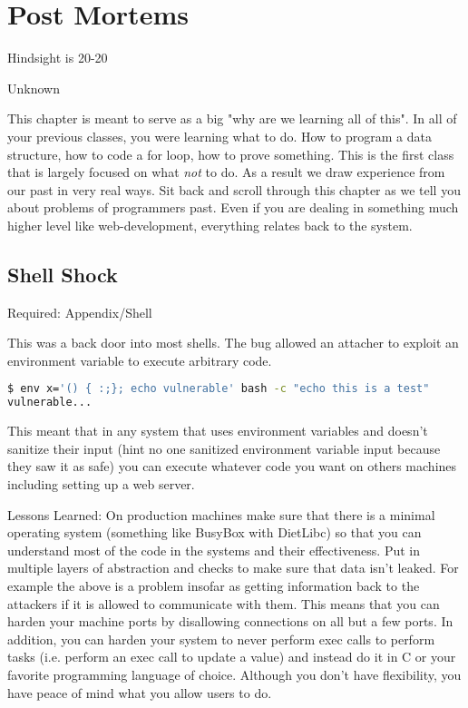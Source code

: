 \chapter{Post Mortems}

\epigraph{Hindsight is 20-20}{Unknown}

This chapter is meant to serve as a big "why are we learning all of this". In all of your previous classes, you were learning what to do. How to program a data structure, how to code a for loop, how to prove something. This is the first class that is largely focused on what \textit{not} to do. As a result we draw experience from our past in very real ways. Sit back and scroll through this chapter as we tell you about problems of programmers past. Even if you are dealing in something much higher level like web-development, everything relates back to the system.

\section{Shell Shock}

Required: Appendix/Shell

This was a back door into most shells. The bug allowed an attacher to exploit an environment variable to execute arbitrary code.

\begin{lstlisting}[language=bash]
$ env x='() { :;}; echo vulnerable' bash -c "echo this is a test"
vulnerable...
\end{lstlisting}

This meant that in any system that uses environment variables and doesn't sanitize their input (hint no one sanitized environment variable input because they saw it as safe) you can execute whatever code you want on others machines including setting up a web server.

Lessons Learned: On production machines make sure that there is a minimal operating system (something like BusyBox with DietLibc) so that you can understand most of the code in the systems and their effectiveness. Put in multiple layers of abstraction and checks to make sure that data isn't leaked. For example the above is a problem insofar as getting information back to the attackers if it is allowed to communicate with them. This means that you can harden your machine ports by disallowing connections on all but a few ports. In addition, you can harden your system to never perform exec calls to perform tasks (i.e. perform an exec call to update a value) and instead do it in C or your favorite programming language of choice. Although you don't have flexibility, you have peace of mind what you allow users to do.


